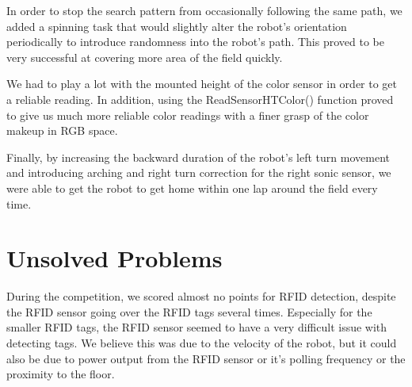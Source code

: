 \documentclass[journal]{IEEEtran}
\begin{document}
In order to stop the search pattern from occasionally following the same path, we added a spinning task that would slightly alter the robot's orientation periodically to introduce randomness into the robot's path. This proved to be very successful at covering more area of the field quickly. 

We had to play a lot with the mounted height of the color sensor in order to get a reliable reading. In addition, using the ReadSensorHTColor() function proved to give us much more reliable color readings with a finer grasp of the color makeup in RGB space. 

Finally, by increasing the backward duration of the robot's left turn movement and introducing arching and right turn correction for the right sonic sensor, we were able to get the robot to get home within one lap around the field every time.

\section{Unsolved Problems}\label{S.unsolved}
During the competition, we scored almost no points for RFID detection, despite the RFID sensor going over the RFID tags several times. Especially for the smaller RFID tags, the RFID sensor seemed to have a very difficult issue with detecting tags. We believe this was due to the velocity of the robot, but it could also be due to power output from the RFID sensor or it's polling frequency or the proximity to the floor. 
\end{document}
